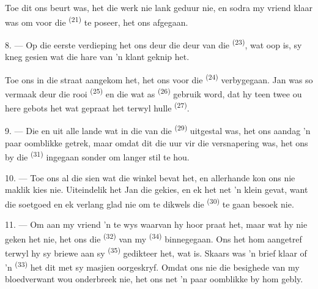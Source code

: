 Toe dit ons beurt was, het die werk nie lank geduur nie, en sodra my vriend klaar was om
voor die  \textsuperscript{(21)} te poseer, het ons afgegaan.

8. --- Op die eerste verdieping het ons deur die deur van die 
\textsuperscript{(23)}, wat oop is, sy kneg gesien wat die hare van 'n klant geknip het.

Toe ons in die straat aangekom het, het ons voor die 
\textsuperscript{(24)} verbygegaan. Jan was so vermaak deur die rooi 
\textsuperscript{(25)} en die  wat as 
\textsuperscript{(26)} gebruik word, dat hy teen twee ou here gebots het wat gepraat het
terwyl hulle  \textsuperscript{(27)}.

\VUsaut{3.0mm}

9. --- Die  en  uit alle lande wat in die
 van die  \textsuperscript{(29)} uitgestal was,
het ons aandag 'n paar oomblikke getrek, maar omdat dit die uur vir die versnapering was,
het ons by die  \textsuperscript{(31)} ingegaan sonder om langer
stil te hou.

10. --- Toe ons al die  sien wat die winkel bevat het,  en allerhande  kon ons nie maklik kies nie.
Uiteindelik het Jan die  gekies, en ek het net 'n klein
 gevat, want die soetgoed  en ek verlang
glad nie om te dikwels die  \textsuperscript{(30)} te gaan besoek nie.

\VUsaut{3.0mm}

11. --- Om aan my vriend 'n  te wys waarvan hy hoor praat het, maar
wat hy nie geken het nie, het ons die  \textsuperscript{(32)} van my
 \textsuperscript{(34)} binnegegaan. Ons het hom aangetref terwyl hy sy
briewe aan sy  \textsuperscript{(35)} gedikteer het, wat
 is. Skaars was 'n brief klaar of 'n 
\textsuperscript{(33)} het dit met sy masjien oorgeskryf. Omdat ons nie die besighede van
my bloedverwant wou onderbreek nie, het ons net 'n paar oomblikke by hom gebly.

